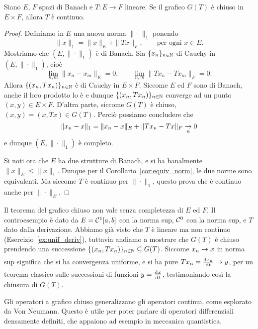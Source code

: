 \begin{theorem}
	Siano $E$, $F$ spazi di Banach e $T : E \to F$ lineare. Se il grafico $G(T)$ è chiuso in $E \times F$, allora $T$ è continuo.
\end{theorem}
\begin{proof}
	Definiamo in $E$ una nuova norma $\|\cdot\|_1$ ponendo
	\begin{equation*}
		\|x\|_1 = \|x\|_E + \|Tx\|_F, \qquad \text{per ogni $x \in E$}.
	\end{equation*}
	Mostriamo che $(E, \|\cdot\|_1)$ è di Banach.
	Sia $\{x_n\}_{n \in \N}$ di Cauchy in $(E, \|\cdot\|_1)$, cioè
	\begin{equation*}
		\lim_{n,m} \|x_n - x_m\|_E = 0, \qquad \lim_{n,m} \|Tx_n - Tx_m\|_F = 0.
	\end{equation*}
	Allora $\{(x_n, Tx_n)\}_{n \in \N}$ è di Cauchy in $E \times F$. Siccome $E$ ed $F$ sono di Banach, anche il loro prodotto lo è e dunque $\{(x_n, Tx_n)\}_{n \in \N}$ converge ad un punto $(x, y) \in E \times F$. D'altra parte, siccome $G(T)$ è chiuso, $(x,y) = (x,Tx) \in G(T)$.
	Perciò possiamo concludere che
	\begin{equation*}
		\|x_n - x\|_1 = \|x_n - x\|_E + \|Tx_n - Tx\|_F \conv[n] 0
	\end{equation*}
	e dunque $(E, \|\cdot\|_1)$ è completo.

	Si noti ora che $E$ ha due strutture di Banach, e si ha banalmente $\|x\|_E \leq \|x\|_1$. Dunque per il Corollario~\ref{cor:equiv_norm}, le due norme sono equivalenti. Ma siccome $T$ è continuo per $\|\cdot\|_1$, questo prova che è continuo anche per $\|\cdot\|_E$.
\end{proof}

\begin{remark}
	Il teorema del grafico chiuso non vale senza completezza di $E$ ed $F$.
	Il controesempio è dato da $E = \Cone[a,b]$ con la norma sup, $\Czero$ con la norma sup, e $T$ dato dalla derivazione. Abbiamo già visto che $T$ è lineare ma non continuo (Esercizio~\ref{ex:unif_deriv}), tuttavia andiamo a mostrare che $G(T)$ è chiuso prendendo una successione $\{(x_n, Tx_n)\}_{n \in \N} \subseteq G(T)$. Siccome $x_n \conv x$ in norma sup significa che si ha convergenza uniforme, e si ha pure $Tx_n = \der{x_n}{t} \conv y$, per un teorema classico sulle successioni di funzioni $y = \der{x}{t}$, testimoniando così la chiusura di $G(T)$.
\end{remark}

Gli operatori a grafico chiuso generalizzano gli operatori continui, come esplorato da Von Neumann. Questo è utile per poter parlare di operatori differenziali densamente definiti, che appaiono ad esempio in meccanica quantistica.

